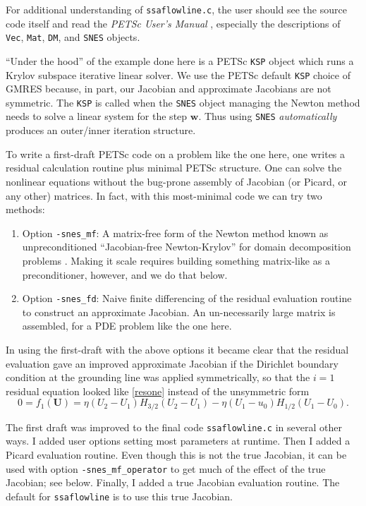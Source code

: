 \documentclass[11pt,final,reqno]{amsart}
\newcommand{\bU}{\mathbf{U}}
\newcommand{\bw}{\mathbf{w}}
\begin{document}
For additional understanding of \texttt{ssaflowline.c}, the user should see the source code itself and read the \emph{PETSc User's Manual} \cite{petsc-user-ref}, especially the descriptions of \texttt{Vec}, \texttt{Mat}, \texttt{DM}, and \texttt{SNES} objects.

``Under the hood'' of the example done here is a PETSc \texttt{KSP} object which runs a Krylov subspace iterative linear solver.  We use the PETSc default \texttt{KSP} choice of GMRES because, in part, our Jacobian and approximate Jacobians are not symmetric.  The \texttt{KSP} is called when the \texttt{SNES} object managing the Newton method needs to solve a linear system for the step $\bw$.  Thus using \texttt{SNES} \emph{automatically} produces an outer/inner iteration structure.

To write a first-draft PETSc code on a problem like the one here, one writes a residual calculation routine plus minimal PETSc structure.  One can solve the nonlinear equations without the bug-prone assembly of Jacobian (or Picard, or any other) matrices.  In fact, with this most-minimal code we can try two methods:\renewcommand{\labelenumi}{\emph{\roman{enumi})}}
\begin{enumerate}
\item Option \texttt{-snes\_mf}:  A matrix-free form of the Newton method known as unpreconditioned ``Jacobian-free Newton-Krylov'' for domain decomposition problems \cite{KnollKeyes2004}.  Making it scale requires building something matrix-like as a preconditioner, however, and we do that below.
\item Option \texttt{-snes\_fd}:  Naive finite differencing of the residual evaluation routine to construct an approximate Jacobian.  An un-necessarily large matrix is assembled, for a PDE problem like the one here.
\end{enumerate}

In using the first-draft with the above options it became clear that the residual evaluation gave an improved approximate Jacobian if the Dirichlet boundary condition at the grounding line was applied symmetrically, so that the $i=1$ residual equation looked like \eqref{resone} instead of the unsymmetric form
	$$0 = f_1(\bU) = \eta(U_2-U_1) H_{3/2} (U_2 - U_1) - \eta(U_1 - u_0) H_{1/2} (U_1 - U_0).$$

The first draft was improved to the final code \texttt{ssaflowline.c} in several other ways.  I added user options setting most parameters at runtime.  Then I added a Picard evaluation routine.  Even though this is not the true Jacobian, it can be used with option \texttt{-snes\_mf\_operator} to get much of the effect of the true Jacobian; see below.  Finally, I added a true Jacobian evaluation routine.  The default for \texttt{ssaflowline} is to use this true Jacobian.
\end{document}
